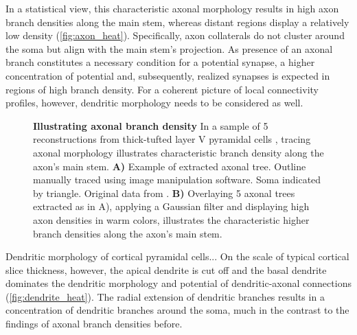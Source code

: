 In a statistical view, this characteristic axonal morphology results
in high axon branch densities along the main stem, whereas distant
regions display a relatively low density
(\autoref{fig:axon_heat}). Specifically, axon collaterals do not
cluster around the soma but align with the main stem's projection. As
presence of an axonal branch constitutes a necessary condition for a
potential synapse, a higher concentration of potential and,
subsequently, realized synapses is expected in regions of high branch
density. For a coherent picture of local connectivity profiles,
however, dendritic morphology needs to be considered as well. 

 
\begin{figure}[!htbp]
  \centering 
    \caption{%
      \textbf{Illustrating axonal branch density}
      In a sample of 5 reconstructions from thick-tufted layer V pyramidal
      cells \parencite{Romand2011}, tracing axonal morphology illustrates
      characteristic branch density along the axon's main
      stem. \textbf{A)} Example of extracted axonal tree. Outline manually
      traced using image manipulation software. Soma indicated by
      triangle. Original data from \textcite{Romand2011}. \textbf{B)}
      Overlaying 5 axonal trees extracted as in A), 
      applying a Gaussian filter and displaying high axon densities in
      warm colors, illustrates the characteristic higher branch
      densities along the axon's main stem.}
  \label{fig:axon_heat}
\end{figure}
\vspace{-0.2cm}

Dendritic morphology of cortical pyramidal cells... %
On the scale of typical cortical slice thickness, however, the apical
dendrite is cut off and the basal dendrite dominates the dendritic
morphology and potential of dendritic-axonal connections
(\autoref{fig:dendrite_heat}). The radial extension of dendritic branches results in a
concentration of dendritic branches around the soma, much
in the contrast to the findings of axonal branch densities before.

